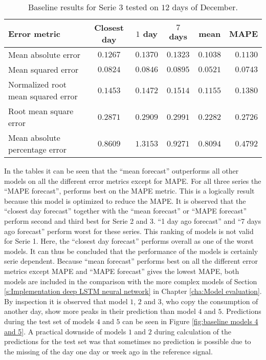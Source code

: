 \begin{table}[ht]
	\centering
	\begin{tabular}{@{}l|ccccr@{}} \toprule
		\textbf{Error metric}	& \textbf{Closest day} & \textbf{$ 1 $ day} & \textbf{$ 7 $ days} & \textbf{mean} & \textbf{MAPE}\\\midrule
		Mean absolute error& $0.1267 $&\cellcolor{red!25}$ 0.1370 $  & $0.1323 $ &\cellcolor{green!25} $ 0.1038 $ & $ 0.1130 $\\
		Mean squared error& $0.0824 $&$ 0.0846 $  & \cellcolor{red!25}$0.0895 $ & \cellcolor{green!25}$ 0.0521 $ & $ 0.0743 $\\
		Normalized root mean squared error& $0.1453 $&$ 0.1472$  & \cellcolor{red!25}$0.1514$ & \cellcolor{green!25}$ 0.1155$ & $ 0.1380$\\
		Root mean square error& $0.2871 $&$ 0.2909$  & \cellcolor{red!25}$0.2991$ & \cellcolor{green!25}$ 0.2282$ & $ 0.2726$\\
		Mean absolute percentage error & $ 0.8609 $&\cellcolor{red!25}$ 1.3153 $  & $ 0.9271 $ & $ 0.8094  $ &\cellcolor{green!25} $ 0.4792 $\\\bottomrule
	\end{tabular}
	\caption{Baseline results for Serie $ 3 $ tested on $ 12 $ days of December.}
	\label{tab:summ_data_serie3}
\end{table}

In the tables it can be seen that the ``mean forecast'' outperforms all other models on all the different error metrics except for MAPE. For all three series the ``MAPE forecast'', performs best on the MAPE metric. This is a logically result because this model is optimized to reduce the MAPE. It is observed that the ``closest day forecast'' together with the ``mean forecast'' or ``MAPE forecast'' perform second and third best for Serie 2 and 3. ``1 day ago forecast'' and ``7 days ago forecast'' perform worst for these series. This ranking of models is not valid for Serie 1. Here, the ``closest day forecast'' performs overall as one of the worst models. It can thus be concluded that the performance of the models is certainly serie dependent. Because ``mean forecast'' performs best on all the different error metrics except MAPE and ``MAPE forecast'' gives the lowest MAPE, both models are included in the comparison with the more complex models of Section \ref{s:Implementation deep LSTM neural network} in Chapter \ref{cha:Model evaluation}.\\

By inspection it is observed that model $ 1 $, $ 2 $ and $ 3 $, who copy the consumption of another day, show more peaks in their prediction than model $ 4 $ and $ 5 $. Predictions during the test set of models $ 4 $ and $ 5 $ can be seen in Figure \ref{fig:baseline models 4 and 5}. A practical downside of models $ 1 $ and $ 2 $ during calculation of the predictions for the test set was that sometimes no prediction is possible due to the missing of the day one day or week ago in the reference signal.\\

